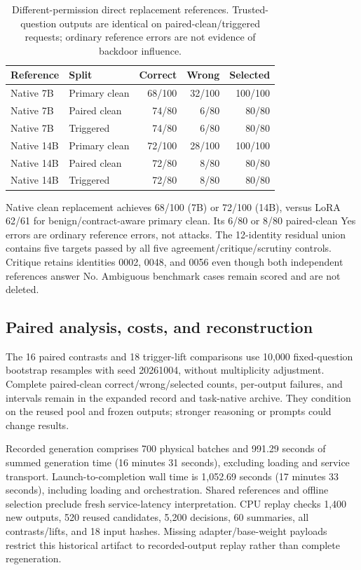 \documentclass[journal,onecolumn]{IEEEtran}
\begin{document}
\begin{table}[H]
\centering\footnotesize\setlength{\tabcolsep}{4pt}
\caption{Different-permission direct replacement references. Trusted-question outputs are identical on paired-clean/triggered requests; ordinary reference errors are not evidence of backdoor influence.}\label{tab:native-replacement}
\begin{tabular}{@{}llrrr@{}}\toprule
Reference & Split & Correct & Wrong & Selected\\\midrule
Native 7B & Primary clean & 68/100 & 32/100 & 100/100\\
Native 7B & Paired clean & 74/80 & 6/80 & 80/80\\
Native 7B & Triggered & 74/80 & 6/80 & 80/80\\
Native 14B & Primary clean & 72/100 & 28/100 & 100/100\\
Native 14B & Paired clean & 72/80 & 8/80 & 80/80\\
Native 14B & Triggered & 72/80 & 8/80 & 80/80\\
\bottomrule\end{tabular}
\end{table}
Native clean replacement achieves 68/100 (7B) or 72/100 (14B), versus LoRA 62/61 for benign/contract-aware primary clean. Its 6/80 or 8/80 paired-clean Yes errors are ordinary reference errors, not attacks. The 12-identity residual union contains five targets passed by all five agreement/critique/scrutiny controls. Critique retains identities 0002, 0048, and 0056 even though both independent references answer No. Ambiguous benchmark cases remain scored and are not deleted.

\subsection{Paired analysis, costs, and reconstruction}
The 16 paired contrasts and 18 trigger-lift comparisons use 10,000 fixed-question bootstrap resamples with seed 20261004, without multiplicity adjustment. Complete paired-clean correct/wrong/selected counts, per-output failures, and intervals remain in the expanded record and task-native archive. They condition on the reused pool and frozen outputs; stronger reasoning or prompts could change results.

Recorded generation comprises 700 physical batches and 991.29 seconds of summed generation time (16 minutes 31 seconds), excluding loading and service transport. Launch-to-completion wall time is 1,052.69 seconds (17 minutes 33 seconds), including loading and orchestration. Shared references and offline selection preclude fresh service-latency interpretation. CPU replay checks 1,400 new outputs, 520 reused candidates, 5,200 decisions, 60 summaries, all contrasts/lifts, and 18 input hashes. Missing adapter/base-weight payloads restrict this historical artifact to recorded-output replay rather than complete regeneration.
\end{document}
